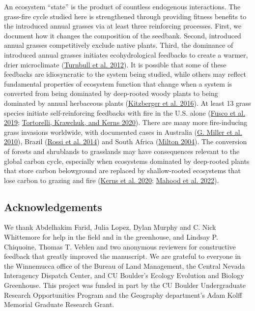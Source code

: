 \documentclass[
  12pt,
]{article}
\begin{document}
An ecosystem ``state'' is the product of countless endogenous
interactions. The grass-fire cycle studied here is strengthened through
providing fitness benefits to the introduced annual grasses via at least
three reinforcing processes. First, we document how it changes the
composition of the seedbank. Second, introduced annual grasses
competitively exclude native plants. Third, the dominance of introduced
annual grasses initiates ecohydrological feedbacks to create a warmer,
drier microclimate (\protect\hyperlink{ref-Turnbull2012}{Turnbull et al.
2012}). It is possible that some of these feedbacks are idiosyncratic to
the system being studied, while others may reflect fundamental
properties of ecosystem function that change when a system is converted
from being dominated by deep-rooted woody plants to being dominated by
annual herbaceous plants
(\protect\hyperlink{ref-Kitzberger2016}{Kitzberger et al. 2016}). At
least 13 grass species initiate self-reinforcing feedbacks with fire in
the U.S. alone (\protect\hyperlink{ref-Fusco2019}{Fusco et al. 2019};
\protect\hyperlink{ref-Tortorelli2020}{Tortorelli, Krawchuk, and Kerns
2020}). There are many more fire-inducing grass invasions worldwide,
with documented cases in Australia
(\protect\hyperlink{ref-Miller2010}{G. Miller et al. 2010}), Brazil
(\protect\hyperlink{ref-Rossi2014}{Rossi et al. 2014}) and South Africa
(\protect\hyperlink{ref-Milton2004}{Milton 2004}). The conversion of
forests and shrublands to grasslands may have consequences relevant to
the global carbon cycle, especially when ecosystems dominated by
deep-rooted plants that store carbon belowground are replaced by
shallow-rooted ecosystems that lose carbon to grazing and fire
(\protect\hyperlink{ref-Kerns2020}{Kerns et al. 2020};
\protect\hyperlink{ref-Mahood2021}{Mahood et al. 2022}).

\hypertarget{acknowledgements}{%
\subsection{Acknowledgements}\label{acknowledgements}}

We thank Abdelhakim Farid, Julia Lopez, Dylan Murphy and C. Nick
Whittemore for help in the field and in the greenhouse, and Lindsay P.
Chiquoine, Thomas T. Veblen and two anonymous reviewers for constructive
feedback that greatly improved the manuscript. We are grateful to
everyone in the Winnemucca office of the Bureau of Land Management, the
Central Nevada Interagency Dispatch Center, and CU Boulder's Ecology
Evolution and Biology Greenhouse. This project was funded in part by the
CU Boulder Undergraduate Research Opportunities Program and the
Geography department's Adam Kolff Memorial Graduate Research Grant.
\end{document}
